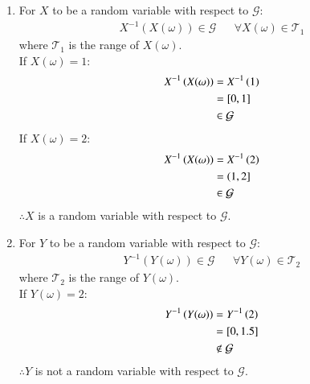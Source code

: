\documentclass[journal,12pt,twocolumn]{IEEEtran}
\theoremstyle{remark}
\begin{document}
\begin{enumerate}
    \item For $X$ to be a random variable with respect to $\mathcal{G}$:
    \begin{align}
        X^{-1}(X(\omega)) \in \mathcal{G} && \forall X(\omega) \in \mathcal{T}_1
    \end{align}
    where $\mathcal{T}_1$ is the range of $X(\omega)$.\\
    If $X(\omega) = 1:$
    \begin{align}
        X^{-1}\left(X(\omega)\right) &= X^{-1}\left(1\right)\\
        &= [0, 1] \\
        &\in \mathcal{G}
    \end{align}
    If $X(\omega) = 2:$
    \begin{align}
        X^{-1}\left(X(\omega)\right) &= X^{-1}\left(2\right)\\
        &= (1, 2] \\
        &\in \mathcal{G}
    \end{align}
    $\therefore X$ is a random variable with respect to $\mathcal{G}$.

    \item For $Y$ to be a random variable with respect to $\mathcal{G}$:
    \begin{align}
        Y^{-1}(Y(\omega)) \in \mathcal{G} && \forall Y(\omega) \in \mathcal{T}_2
    \end{align}
    where $\mathcal{T}_2$ is the range of $Y(\omega)$.\\
    If $Y(\omega) = 2:$
    \begin{align}
        Y^{-1}\left(Y(\omega)\right) &= Y^{-1}\left(2\right)\\
        &= [0, 1.5] \\
        &\notin \mathcal{G}
    \end{align}
    $\therefore Y$ is not a random variable with respect to $\mathcal{G}$.
\end{enumerate}
\end{document}
